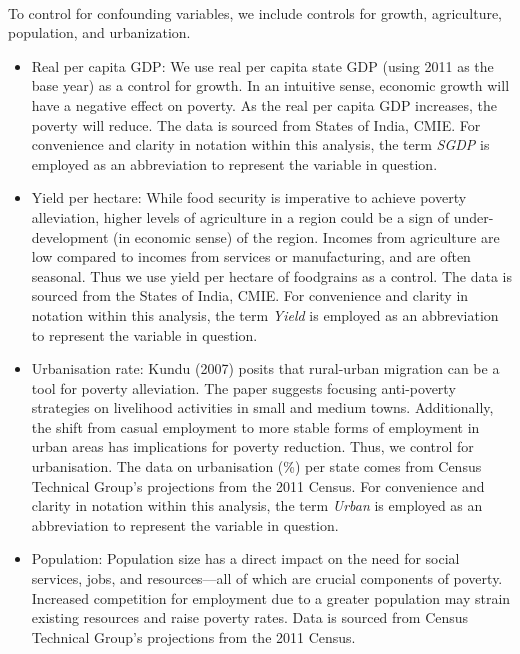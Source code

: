 \documentclass [12pt]{article}
\begin{document}
\paragraph{} To control for confounding variables, we include controls for growth, agriculture, population,  and urbanization.
\begin{itemize}
    \item Real per capita GDP: We use real per capita state GDP (using 2011 as the base year) as a control for growth. In an intuitive sense, economic growth will have a negative effect on poverty. As the real per capita GDP increases, the poverty will reduce. The data is sourced from States of India, CMIE. For convenience and clarity in notation within this analysis, the term \textit{SGDP} is employed as an abbreviation to represent the variable in question.
    \item Yield per hectare: While food security is imperative to achieve poverty alleviation, higher levels of agriculture in a region could be a sign of under-development (in economic sense) of the region. Incomes from agriculture are low compared to incomes from services or manufacturing, and are often seasonal. Thus we use yield per hectare of foodgrains as a control. The data is sourced from the States of India, CMIE. For convenience and clarity in notation within this analysis, the term \textit{Yield} is employed as an abbreviation to represent the variable in question.
    \item Urbanisation rate: Kundu (2007) posits that rural-urban migration can be a tool for poverty alleviation. The paper suggests focusing anti-poverty strategies on livelihood activities in small and medium towns. Additionally, the shift from casual employment to more stable forms of employment in urban areas has implications for poverty reduction. Thus, we control for urbanisation. The data on urbanisation (\%) per state comes from Census Technical Group's projections from the 2011 Census. For convenience and clarity in notation within this analysis, the term \textit{Urban} is employed as an abbreviation to represent the variable in question. 
    \item Population: Population size has a direct impact on the need for social services, jobs, and resources—all of which are crucial components of poverty. Increased competition for employment due to a greater population may strain existing resources and raise poverty rates. Data is sourced from Census Technical Group's projections from the 2011 Census.  
\end{itemize}
\newpage
\end{document}
